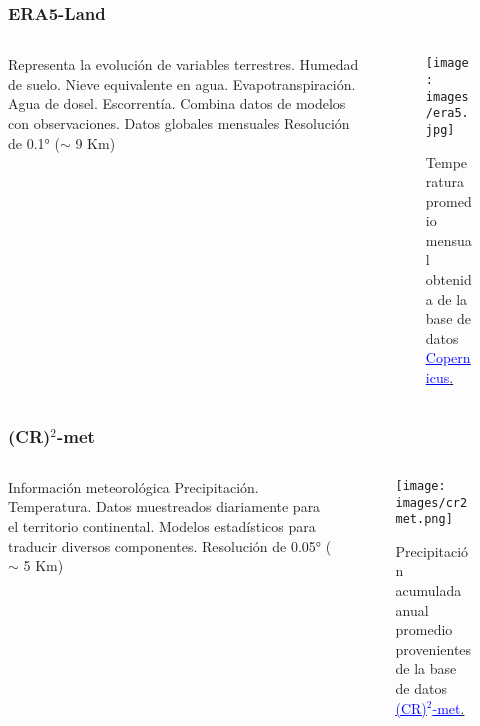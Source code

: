 \documentclass{beamer}
\begin{document}
  \begin{frame}
    \frametitle{ERA5-Land}
    \begin{columns}

      \begin{column}{0.5\textwidth}
        \begin{outline}
          \1 Representa la evolución de variables terrestres.
            \2 Humedad de suelo.
            \2 Nieve equivalente en agua.
            \2 Evapotranspiración.
            \2 Agua de dosel.
            \2 Escorrentía.
          \1 Combina datos de modelos con observaciones.
          \1 Datos globales mensuales
          \1 Resolución de 0.1° ($\sim$ 9 Km)
        \end{outline}
      \end{column}

      \begin{column}{0.5\textwidth}
        \begin{figure}
          \centering
          \texttt{[image: images/era5.jpg]}
          \caption{Temperatura promedio mensual obtenida de la base de datos 
          \href{https://cds.climate.copernicus.eu/cdsapp\#!/dataset/reanalysis-era5-land-monthly-means?tab=form/}
          {\textcolor{blue}{\underline{Copernicus}}.}}
        \end{figure}
      \end{column}

    \end{columns}
  \end{frame}

  \begin{frame}
    \frametitle{(CR)$^2$-met}
    \begin{columns}
      \begin{column}{0.5\textwidth}
        \begin{outline}
          \1 Información meteorológica
            \2 Precipitación.
            \2 Temperatura.
          \1 Datos muestreados diariamente para el territorio continental.
          \1 Modelos estadísticos para traducir diversos componentes.  
          \1 Resolución de 0.05° ($\sim$ 5 Km)
        \end{outline}
      \end{column}

      \begin{column}{0.5\textwidth}
        \begin{figure}
          \centering
          \texttt{[image: images/cr2met.png]}
          \caption{Precipitación acumulada anual promedio provenientes de la base de datos 
            \href{https://www.cr2.cl/datos-productos-grillados/}{\textcolor{blue}{\underline{(CR)$^2$-met}}.}}
        \end{figure}
      \end{column}
    \end{columns}

  \end{frame}
\end{document}
